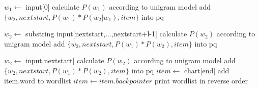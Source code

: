 \documentclass[11pt]{article}
\begin{document}
\begin{algorithm}[htb]
\begin{algorithmic}[1]
		\STATE $w_1 \gets$ input[0]
		\STATE calculate $P(w_1)$ according to unigram model  
		\STATE add $\{w_2,nextstart,P(w_1)*P(w_2|w_1),item\}$ into pq
		\ENDIF
		
		\ELSE
		\STATE $w_2 \gets$ substring input[nextstart,...,nextstart+l-1] 
		\STATE calculate $P(w_2)$ according to unigram model 
		\STATE add $\{w_2,nextstart,P(w_1)*P(w_2),item\}$ into pq
		\ENDFOR
		
		\STATE $w_2 \gets$ input[nextstart]
		\STATE calculate $P(w_2)$ according to unigram model  
		\STATE add $\{w_2,nextstart,P(w_1)*P(w_2),item\}$ into pq
		\ENDIF
		\ENDIF
		\ENDWHILE
		\STATE $item \gets$ chart[end]
		\STATE add item.word to wordlist
		\STATE $item \gets item.backpointer$
		\ENDWHILE
		\STATE print wordlist in reverse order
	\end{algorithmic}
\end{algorithm}
\end{document}
